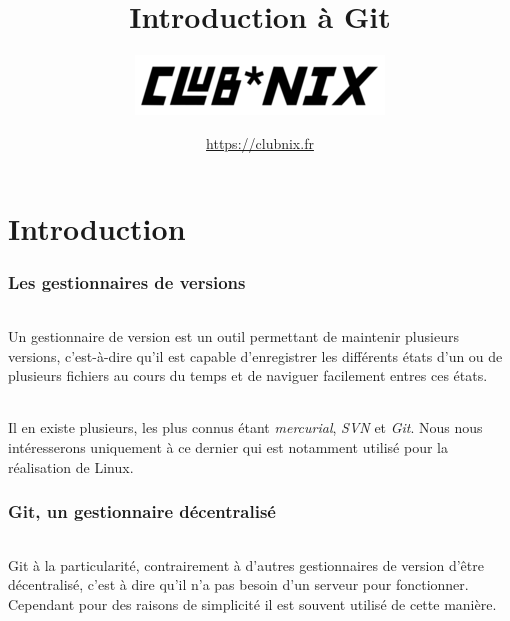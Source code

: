 \documentclass[french, a4paper, 12pt, titlepage]{article}
\begin{document}
\title{Introduction à Git}
\author{\includegraphics{clubnix}}
\date{\url{https://clubnix.fr}}

\maketitle

\vfill
\pagebreak

\newpage
\strut\thispagestyle{empty}
\vfill
\pagebreak
\tableofcontents
\strut\thispagestyle{empty}
\newpage
\setcounter{page}{1}

\part{Introduction}

\section{Les gestionnaires de versions}

\paragraph{} Un gestionnaire de version est un outil permettant de maintenir plusieurs versions, c'est-à-dire qu'il est capable d'enregistrer les différents états d'un ou de plusieurs fichiers au cours du temps et de naviguer facilement entres ces états.

\paragraph{}Il en existe plusieurs, les plus connus étant \emph{mercurial}, \emph{SVN} et \emph{Git}.  Nous nous intéresserons uniquement à ce dernier qui est notamment utilisé pour la réalisation de Linux.

\section{Git, un gestionnaire décentralisé}

\paragraph{} Git à la particularité, contrairement à d'autres gestionnaires de version d'être décentralisé, c'est à dire qu'il n'a pas besoin d'un serveur pour fonctionner.  Cependant pour des raisons de simplicité il est souvent utilisé de cette manière.
\end{document}
